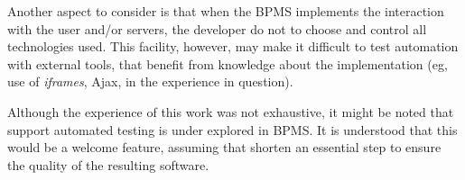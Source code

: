 \documentclass[runningheads,a4paper]{llncs}
\begin{document}
Another aspect to consider is that when the BPMS implements the interaction with the user and/or servers, the developer do not to choose and control all technologies used. This facility, however, may make it difficult to test automation with external tools, that benefit from knowledge about the implementation (eg, use of \emph{iframes}, Ajax, in the experience in question).


Although the experience of this work was not exhaustive, it might be noted that support automated testing is under explored in BPMS. It is understood that this would be a welcome feature, assuming that shorten an essential step to ensure the quality of the resulting software.
\end{document}
